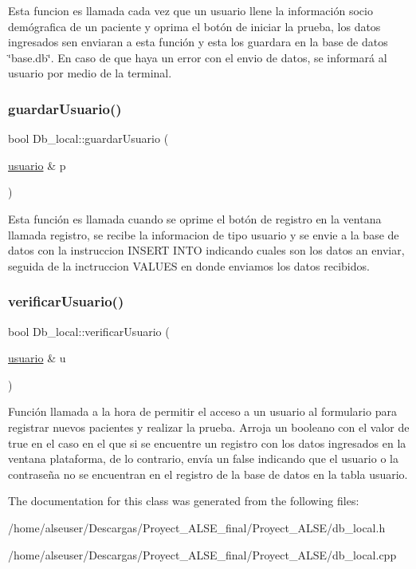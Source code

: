 Esta funcion es llamada cada vez que un usuario llene la información socio demógrafica de un paciente y oprima el botón de iniciar la prueba, los datos ingresados sen enviaran a esta función y esta los guardara en la base de datos \char`\"{}base.\+db\char`\"{}. En caso de que haya un error con el envio de datos, se informará al usuario por medio de la terminal. \mbox{\label{class_db__local_a4e9a7db9c77ac8792f83dbf24f55fce4}} 
\subsubsection{\texorpdfstring{guardar\+Usuario()}{guardarUsuario()}}
{\footnotesize\ttfamily bool Db\+\_\+local\+::guardar\+Usuario (\begin{DoxyParamCaption}\item[{\hyperlink{classusuario}{usuario} \&}]{p }\end{DoxyParamCaption})}

Esta función es llamada cuando se oprime el botón de registro en la ventana llamada registro, se recibe la informacion de tipo usuario y se envie a la base de datos con la instruccion I\+N\+S\+E\+RT I\+N\+TO indicando cuales son los datos an enviar, seguida de la inctruccion V\+A\+L\+U\+ES en donde enviamos los datos recibidos. \mbox{\label{class_db__local_aa2a0ccc915239506dd8c00a2da864fb6}} 
\subsubsection{\texorpdfstring{verificar\+Usuario()}{verificarUsuario()}}
{\footnotesize\ttfamily bool Db\+\_\+local\+::verificar\+Usuario (\begin{DoxyParamCaption}\item[{\hyperlink{classusuario}{usuario} \&}]{u }\end{DoxyParamCaption})}

Función llamada a la hora de permitir el acceso a un usuario al formulario para registrar nuevos pacientes y realizar la prueba. Arroja un booleano con el valor de true en el caso en el que si se encuentre un registro con los datos ingresados en la ventana plataforma, de lo contrario, envía un false indicando que el usuario o la contraseña no se encuentran en el registro de la base de datos en la tabla usuario. 

The documentation for this class was generated from the following files\+:\begin{DoxyCompactItemize}
\item 
/home/alseuser/\+Descargas/\+Proyect\+\_\+\+A\+L\+S\+E\+\_\+final/\+Proyect\+\_\+\+A\+L\+S\+E/db\+\_\+local.\+h\item 
/home/alseuser/\+Descargas/\+Proyect\+\_\+\+A\+L\+S\+E\+\_\+final/\+Proyect\+\_\+\+A\+L\+S\+E/db\+\_\+local.\+cpp\end{DoxyCompactItemize}
